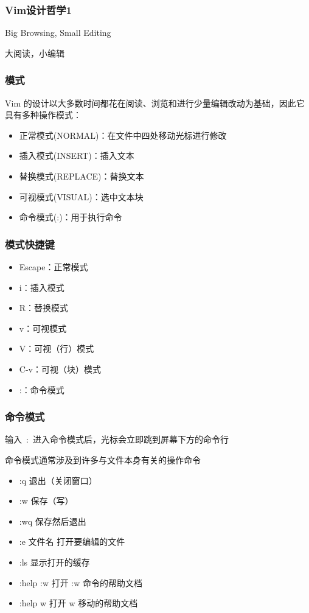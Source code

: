 \documentclass[UTF8, 16pt]{beamer}
\begin{document}
\begin{frame}
    \frametitle{Vim设计哲学1}
    \textcolor{sufered}{Big Browsing, Small Editing}

    \textcolor{sufered}{大阅读，小编辑}
\end{frame}

\begin{frame}
    \frametitle{模式}
    Vim 的设计以大多数时间都花在阅读、浏览和进行少量编辑改动为基础，因此它具有多种操作模式：
    \begin{itemize}
        \item 正常模式(NORMAL)：在文件中四处移动光标进行修改
        \item 插入模式(INSERT)：插入文本
        \item 替换模式(REPLACE)：替换文本
        \item 可视模式(VISUAL)：选中文本块
        \item 命令模式(:)：用于执行命令
    \end{itemize}
\end{frame}

\begin{frame}
    \frametitle{模式快捷键}
    \begin{itemize}
        \item Escape：正常模式
        \item i：插入模式
        \item R：替换模式
        \item v：可视模式
        \item V：可视（行）模式
        \item C-v：可视（块）模式
        \item :：命令模式
    \end{itemize}
\end{frame}

\begin{frame}
    \frametitle{命令模式}
    输入\ :\ 进入命令模式后，光标会立即跳到屏幕下方的命令行

    \textcolor{sufered}{命令模式通常涉及到许多与文件本身有关的操作命令}
    \begin{itemize}
        \item :q 退出（关闭窗口）
        \item :w 保存（写）
        \item :wq 保存然后退出
        \item :e {文件名} 打开要编辑的文件
        \item :ls 显示打开的缓存
        \item :help :w 打开 :w 命令的帮助文档
        \item :help w 打开 w 移动的帮助文档
    \end{itemize}
\end{frame}
\end{document}
